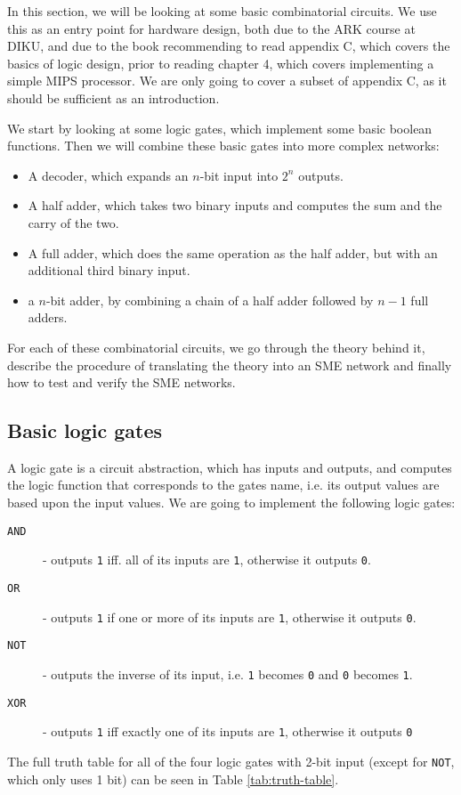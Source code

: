 In this section, we will be looking at some basic combinatorial circuits. We
use this as an entry point for hardware design, both due to the ARK
course\cite{ref:diku} at DIKU, and due to the book\cite{ref:ark} recommending
to read appendix C, which covers the basics of logic design, prior to reading
chapter 4, which covers implementing a simple MIPS processor. We are only going
to cover a subset of appendix C, as it should be sufficient as an introduction.

We start by looking at some logic gates, which implement some basic boolean
functions. Then we will combine these basic gates into more complex networks:
\begin{itemize}
    \item A decoder, which expands an $n$-bit input into $2^n$ outputs.
    \item A half adder, which takes two binary inputs and computes the sum and
        the carry of the two.
    \item A full adder, which does the same operation as the half adder, but
        with an additional third binary input.
    \item a $n$-bit adder, by combining a chain of a half adder followed by
        $n-1$ full adders.
\end{itemize}

For each of these combinatorial circuits, we go through the theory behind it,
describe the procedure of translating the theory into an SME network and
finally how to test and verify the SME networks.

\subsection{Basic logic gates}
A logic gate is a circuit abstraction, which has inputs and outputs, and
computes the logic function that corresponds to the gates name, i.e. its output
values are based upon the input values. We are going to implement the following
logic gates:

\begin{description}
    \item[\texttt{AND}] - outputs \texttt{1} iff. all of its inputs are
        \texttt{1}, otherwise it outputs \texttt{0}.

    \item[\texttt{OR}] - outputs \texttt{1} if one or more of its inputs are
        \texttt{1}, otherwise it outputs \texttt{0}.

    \item[\texttt{NOT}] - outputs the inverse of its input, i.e. \texttt{1}
        becomes \texttt{0} and \texttt{0} becomes \texttt{1}.

    \item[\texttt{XOR}] - outputs \texttt{1} iff exactly one of its inputs are
        \texttt{1}, otherwise it outputs \texttt{0}
\end{description}
The full truth table for all of the four logic gates with 2-bit input (except
for \texttt{NOT}, which only uses 1 bit) can be seen in Table
\ref{tab:truth-table}.


